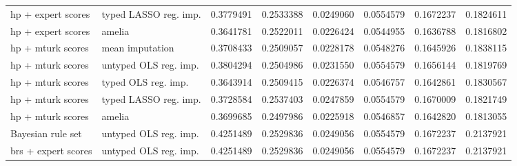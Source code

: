 \begin{tabular}{l|l|rrr|rrr}
hp + expert scores & typed LASSO reg. imp. & 0.3779491 & 0.2533388 & 0.0249060 & 0.0554579 & 0.1672237 & 0.1824611\\
hp + expert scores & amelia & 0.3641781 & 0.2522011 & 0.0226424 & 0.0544955 & 0.1636788 & 0.1816802\\
hp + mturk scores & mean imputation & 0.3708433 & 0.2509057 & 0.0228178 & 0.0548276 & 0.1645926 & 0.1838115\\
hp + mturk scores & untyped OLS reg. imp. & 0.3804294 & 0.2504986 & 0.0231550 & 0.0554579 & 0.1656144 & 0.1819769\\
hp + mturk scores & typed OLS reg. imp. & 0.3643914 & 0.2509415 & 0.0226374 & 0.0546757 & 0.1642861 & 0.1830567\\
hp + mturk scores & typed LASSO reg. imp. & 0.3728584 & 0.2537403 & 0.0247859 & 0.0554579 & 0.1670009 & 0.1821749\\
hp + mturk scores & amelia & 0.3699685 & 0.2497986 & 0.0225918 & 0.0546857 & 0.1642820 & 0.1813055\\
Bayesian rule set & untyped OLS reg. imp. & 0.4251489 & 0.2529836 & 0.0249056 & 0.0554579 & 0.1672237 & 0.2137921\\
brs + expert scores & untyped OLS reg. imp. & 0.4251489 & 0.2529836 & 0.0249056 & 0.0554579 & 0.1672237 & 0.2137921\\
\bottomrule
\end{tabular}


